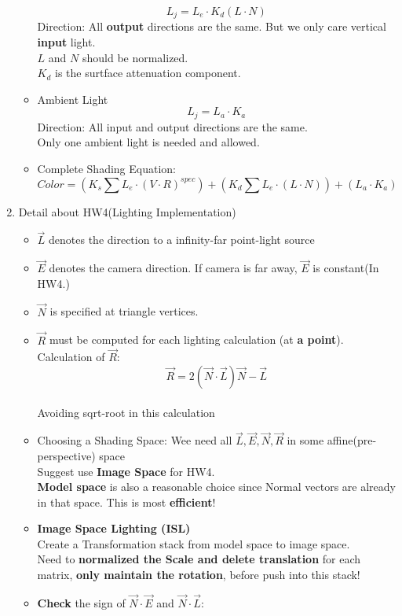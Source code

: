 \documentclass[cyan,normal,en]{elegantnote}
\begin{document}
\begin{enumerate}
\begin{itemize}
		$$L_j = L_e \cdot K_d (L\cdot N)$$
		Direction: All \textbf{output} directions are the same. But we only care vertical \textbf{input} light.\\
		$L$ and $N$ should be normalized.\\
		$K_d$ is the surtface attenuation component.
		\item Ambient Light\\
		$$L_j = L_a \cdot K_a$$
		Direction: All input and output directions are the same.\\
		Only one ambient light is needed and allowed.
		\item Complete Shading Equation:
		$$Color=(K_s\sum{ L_e \cdot (V\cdot R)^{spec}}) + (K_d\sum{ L_e \cdot (L\cdot N)}) + (L_a \cdot K_a)$$	
	\end{itemize}
	\item Detail about HW4(Lighting Implementation)
	\begin{itemize}
		\item $\vec{L}$ denotes the direction to a infinity-far point-light source
		\item $\vec{E}$ denotes the camera direction. If camera is far away, $\vec{E}$ is constant(In HW4.)
		\item $\vec{N}$ is specified at triangle vertices.
		\item $\vec{R}$ must be computed for each lighting calculation (at \textbf{a point}).\\
		Calculation of $\vec{R}$:\\
		$$\vec{R}=2(\vec{N}\cdot \vec{L})\vec{N}-\vec{L}$$\\
		Avoiding sqrt-root in this calculation
		\item Choosing a Shading Space: Wee need all $\vec{L},\vec{E},\vec{N},\vec{R}$ in some affine(pre-perspective) space \\
		Suggest use \textbf{Image Space} for HW4. \\
		\textbf{Model space} is also a reasonable choice since Normal vectors are already in that space. This is most \textbf{efficient}!
		\item \textbf{Image Space Lighting (ISL)}\\
		Create a Transformation stack from model space to image space.\\
		Need to \textbf{normalized the Scale and delete translation} for each matrix, \textbf{only maintain the rotation}, before push into this stack!
		\item \textbf{Check} the sign of \textbf{$\vec{N}\cdot\vec{E}$} and \textbf{$\vec{N}\cdot\vec{L}$}:\\

\end{itemize}
\end{enumerate}
\end{document}
